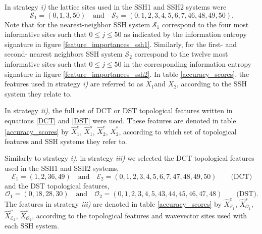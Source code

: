 \documentclass[10pt]{revtex4-1}
\newcommand\xOne{$X_1$}
\newcommand\xcOne{$\hat{X}^c_1$}
\newcommand\xcEOne{$\hat{X}^c_{\mathcal{E}_1}$}
\newcommand\xsOne{$\hat{X}^s_1$}
\newcommand\xsOOne{$\hat{X}^s_{\mathcal{O}_1}$}
\newcommand\xTwo{$X_2$}
\newcommand\xcTwo{$\hat{X}^c_2$}
\newcommand\xcETwo{$\hat{X}^c_{\mathcal{E}_2}$}
\newcommand\xsTwo{$\hat{X}^s_2$}
\newcommand\xsOTwo{$\hat{X}^s_{\mathcal{O}_2}$}
\begin{document}
In strategy \emph{i)} the lattice sites used in the SSH1 and SSH2 systems were
\begin{equation}
\label{lattice_subsets}
\mathcal{S}_1 = (0, 1, 3, 50 ) \quad \text{and} \quad  \mathcal{S}_2 =(0, 1, 2, 3, 4, 5, 6, 7, 46, 48, 49, 50).   
\end{equation}
Note that for the nearest-neighbor SSH system $\mathcal{S}_1$ correspond to the four most informative sites such that $0\leq j \leq 50$ as indicated by the information entropy signature in figure \ref{feature_importances_ssh1}. Similarly, for the first- and second- nearest neighbors SSH system $\mathcal{S}_2$ correspond to the twelve most informative sites such that $0\leq j \leq 50$ in the corresponding information entropy signature in figure \ref{feature_importances_ssh2}. In table \ref{accuracy_scores}, the features used in strategy \emph{i)} are referred to as \xOne and \xTwo, according to the SSH system they relate to.  

In strategy \emph{ii)}, the full set of DCT or DST topological features written in equations \eqref{DCT} and \eqref{DST} were used. These features are denoted in table \ref{accuracy_scores} by \xcOne, \xsOne, \xcTwo, \xsTwo, according to which set of topological features and SSH systems they refer to. 

Similarly to strategy \emph{i)}, in strategy \emph{iii)} we selected the DCT topological features used in the SSH1 and SSH2 systems,
\begin{equation}
\label{DCT_subsets}
\mathcal{E}_1 = (1, 2, 36, 49) \quad \text{and} \quad  \mathcal{E}_2 =(0, 1, 2, 3, 4, 5, 6, 7, 47, 48, 49, 50) \qquad \text{(DCT)}  
\end{equation}
and the DST topological features,
\begin{equation}
\label{DST_subsets}
\mathcal{O}_1 =  (0, 18, 28, 30) \quad \text{and} \quad  \mathcal{O}_2 = (0, 1, 2, 3, 4, 5, 43, 44, 45, 46, 47, 48) \qquad \text{(DST)}.  
\end{equation}
The features in strategy \emph{iii)} are denoted in table \ref{accuracy_scores} by \xcEOne, \xsOOne, \xcETwo, \xsOTwo,   according to the topological features and wavevector sites used with each SSH system. 
\end{document}
